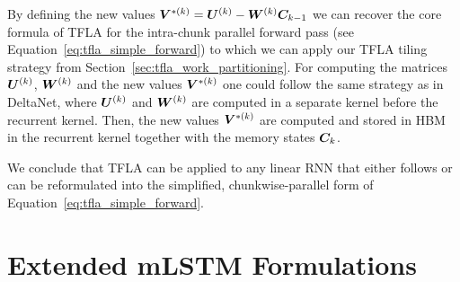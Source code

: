 \documentclass{article}
\begin{document}
    By defining the new values $\bm{V}^{*(k)} = \bm{U}^{(k)} - \bm{W}^{(k)}\bm{C}_{k-1}$ we can recover the core formula of TFLA for the intra-chunk parallel forward pass (see Equation~\eqref{eq:tfla_simple_forward}) to which we can apply our TFLA tiling strategy from Section~\ref{sec:tfla_work_partitioning}.
    For computing the matrices $\bm{U}^{(k)}$, $\bm{W}^{(k)}$ and the new values $\bm{V}^{*(k)}$ one could follow the same strategy as in DeltaNet, where $\bm{U}^{(k)}$ and $\bm{W}^{(k)}$ are computed in a separate kernel before the recurrent kernel. Then, the new values $\bm{V}^{*(k)}$ are computed and stored in HBM in the recurrent kernel together with the memory states $\bm{C}_k$.

    We conclude that TFLA can be applied to any linear RNN that either follows or can be reformulated into the simplified, chunkwise-parallel form of Equation~\eqref{eq:tfla_simple_forward}.
    

    \section{Extended mLSTM Formulations}
    \label{app:extended_mlstm_formulations}
\end{document}
